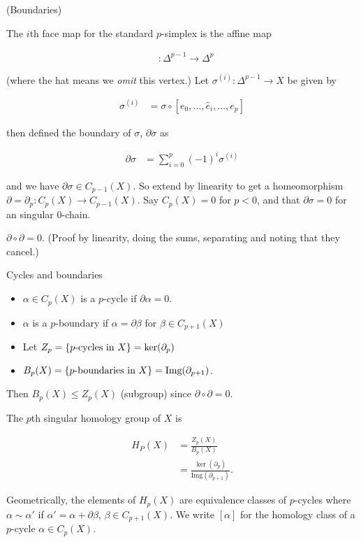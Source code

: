 \begin{defn}
(Boundaries)

The $i$th face map for the standard $p$-simplex is the affine map

\begin{align*}
[e_{0},\dots,\hat{e}_{i},\dots,e_{p}] & :\Delta^{p-1}\to\Delta^{p}
\end{align*}


(where the hat means we \emph{omit} this vertex.) Let $\sigma^{(i)}:\Delta^{p-1}\to X$
be given by

\begin{align*}
\sigma^{(i)} & =\sigma\circ[e_{0},\dots,\hat{e}_{i},\dots,e_{p}]
\end{align*}


then defined the boundary of $\sigma$, $\partial\sigma$ as

\begin{align*}
\partial\sigma & =\sum_{i=0}^{p}(-1)^{i}\sigma^{(i)}
\end{align*}


and we have $\partial\sigma\in C_{p-1}(X)$. So extend by linearity
to get a homeomorphism $\partial=\partial_{p}:C_{p}(X)\to C_{p-1}(X)$.
Say $C_{p}(X)=0$ for $p<0$, and that $\partial\sigma=0$ for an
singular $0$-chain.\end{defn}
\begin{lem}
$\partial\circ\partial=0$. (Proof by linearity, doing the sums, separating
and noting that they cancel.)\end{lem}
\begin{defn}
Cycles and boundaries\end{defn}
\begin{itemize}
\item $\alpha\in C_{p}(X)$ is a $p$-cycle if $\partial\alpha=0$.
\item $\alpha$ is a $p$-boundary if $\alpha=\partial\beta$ for $\beta\in C_{p+1}(X)$
\item Let $Z_{p}=\{\text{\ensuremath{p}-cycles in \ensuremath{X}}\}=\ker(\partial_{p})$
\item $B_{p}(X)=\{\text{\ensuremath{p}-boundaries in \ensuremath{X}}\}=\text{Img}(\partial_{p+1})$.
\end{itemize}
Then $B_{p}(X)\leq Z_{p}(X)$ (subgroup) since $\partial\circ\partial=0$.
\begin{defn}
The $p$th singular homology group of $X$ is

\begin{align*}
H_{P}(X) & =\frac{Z_{p}(X)}{B_{p}(X)}\\
 & =\frac{\ker(\partial_{p})}{\text{Img}(\partial_{p+1})}.
\end{align*}


Geometrically, the elements of $H_{p}(X)$ are equivalence classes
of $p$-cycles where $\alpha\sim\alpha'$ if $\alpha'=\alpha+\partial\beta$,
$\beta\in C_{p+1}(X)$. We write $[\alpha]$ for the homology class
of a $p$-cycle $\alpha\in C_{p}(X)$.\end{defn}
